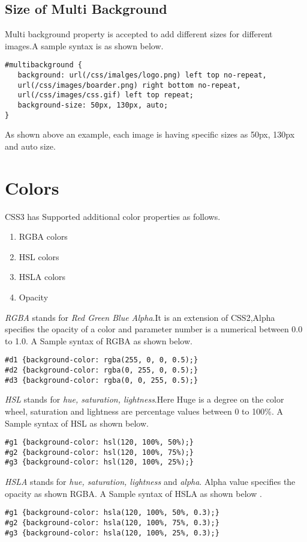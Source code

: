 \documentclass[a4paper,oneside]{book}
\numberwithin{equation}{chapter}
\begin{document}
\subsection{Size of Multi Background}
Multi background property is accepted to add different sizes for different images.A sample syntax is as shown below.
\begin{verbatim}
#multibackground {
   background: url(/css/imalges/logo.png) left top no-repeat, 
   url(/css/images/boarder.png) right bottom no-repeat, 
   url(/css/images/css.gif) left top repeat;
   background-size: 50px, 130px, auto;
}
\end{verbatim}
As shown above an example, each image is having specific sizes as 50px, 130px and auto size.
\section{Colors}
CSS3 has Supported additional color properties as follows.
\begin{enumerate}
\item RGBA colors
\item HSL colors
\item HSLA colors
\item Opacity
\end{enumerate}

\textit{RGBA} stands for \textit{Red Green Blue Alpha}.It is an extension of CSS2,Alpha specifies the opacity of a color and parameter number is a numerical between 0.0 to 1.0. A Sample syntax of RGBA as shown below.
\begin{verbatim}
#d1 {background-color: rgba(255, 0, 0, 0.5);} 
#d2 {background-color: rgba(0, 255, 0, 0.5);}  
#d3 {background-color: rgba(0, 0, 255, 0.5);}
\end{verbatim}

\textit{HSL} stands for \textit{hue, saturation, lightness}.Here Huge is a degree on the color wheel, saturation and lightness are percentage values between 0 to 100\%. A Sample syntax of HSL as shown below.
\begin{verbatim}
#g1 {background-color: hsl(120, 100%, 50%);}  
#g2 {background-color: hsl(120, 100%, 75%);}  
#g3 {background-color: hsl(120, 100%, 25%);}
\end{verbatim}

\textit{HSLA} stands for \textit{hue, saturation, lightness} and \textit{alpha}. Alpha value specifies the opacity as shown RGBA. A Sample syntax of HSLA as shown below .
\begin{verbatim}
#g1 {background-color: hsla(120, 100%, 50%, 0.3);}  
#g2 {background-color: hsla(120, 100%, 75%, 0.3);}  
#g3 {background-color: hsla(120, 100%, 25%, 0.3);}  
\end{verbatim}
\end{document}
